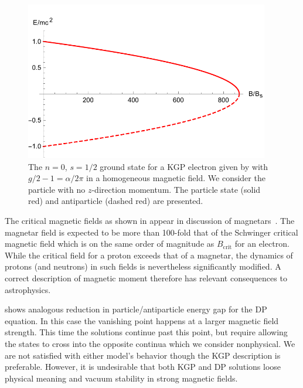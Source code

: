 \begin{figure}[ht]
     \centering
     \includegraphics[clip, trim=0.0cm 0.0cm 0.0cm 0.5cm,width=0.95\textwidth]{plots/chap02moment/lanplot01.pdf}
     \caption{The $n=0$, $s=1/2$ ground state for a KGP electron given by  with $g/2-1=\alpha/2\pi$ in a homogeneous magnetic field. We consider the particle with no $z$-direction momentum. The particle state (solid red) and antiparticle (dashed red) are presented.}
     \label{f01}
\end{figure}

The critical magnetic fields as shown in  appear in discussion of magnetars~\citep{Kaspi:2017fwg}. The magnetar field is expected to be more than 100-fold that of the Schwinger critical magnetic field which is on the same order of magnitude as $B_\textrm{crit}$ for an electron. While the critical field for a proton exceeds that of a magnetar, the dynamics of protons (and neutrons) in such fields is nevertheless significantly modified. A correct description of magnetic moment therefore has relevant consequences to astrophysics. 

 shows analogous reduction in particle/anti\-particle energy gap for the DP equation. In this case the vanishing point happens at a larger magnetic field strength. This time the solutions continue past this point, but require allowing the states to cross into the opposite continua which we consider nonphysical. We are not satisfied with either model\rq s behavior though the KGP description is preferable. However, it is undesirable that both KGP and DP solutions loose physical meaning and vacuum stability in strong magnetic fields.

